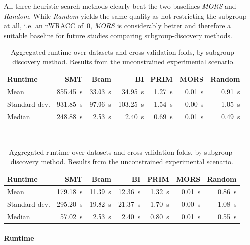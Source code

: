\documentclass{article}
\theoremstyle{definition}
\begin{document}
All three heuristic search methods clearly beat the two baselines \emph{MORS} and \emph{Random}.
While \emph{Random} yields the same quality as not restricting the subgroup at all, i.e. an nWRACC of~0, \emph{MORS} is considerably better and therefore a suitable baseline for future studies comparing subgroup-discovery methods.

\begin{table}
	\centering
	\begin{subtable}{\textwidth}
		\begin{tabular}{l|rrrrrr}
			\toprule
			Runtime & SMT & Beam & BI & PRIM & MORS & Random \\
			\midrule
			Mean & 855.45~s & 33.03~s & 34.95~s & 1.27~s & 0.01~s & 0.91~s \\
			Standard dev. & 931.85~s & 97.06~s & 103.25~s & 1.54~s & 0.00~s & 1.05~s \\
			Median & 248.88~s & 2.53~s & 2.40~s & 0.69~s & 0.01~s & 0.49~s \\
			\bottomrule
		\end{tabular}
		\caption{
			All datasets.
		}
		\label{tab:csd:unconstrained-methods-runtime-all-datasets}
	\end{subtable}
	\\ \vspace{\baselineskip}
	\begin{subtable}{\textwidth}
		\centering
		\begin{tabular}{l|rrrrrr}
			\toprule
			Runtime & SMT & Beam & BI & PRIM & MORS & Random \\
			\midrule
			Mean & 179.18~s & 11.39~s & 12.36~s & 1.32~s & 0.01~s & 0.86~s \\
			Standard dev. & 295.20~s & 19.82~s & 21.37~s & 1.70~s & 0.00~s & 1.08~s \\
			Median & 57.02~s & 2.53~s & 2.40~s & 0.80~s & 0.01~s & 0.55~s \\
			\bottomrule
		\end{tabular}
		\caption{
			Datasets without \emph{SMT} timeouts.
		}
		\label{tab:csd:unconstrained-methods-runtime-no-timeout-datasets}
	\end{subtable}
	\caption{
		Aggregated runtime over datasets and cross-validation folds, by subgroup-discovery method.
		Results from the unconstrained experimental scenario.
	}
	\label{tab:csd:unconstrained-methods-runtime}
\end{table}

\paragraph{Runtime}
\end{document}

